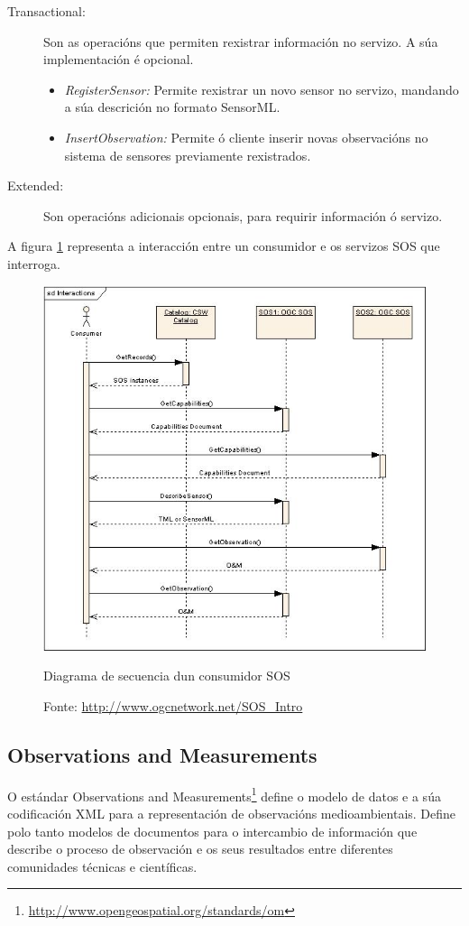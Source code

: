 \begin{description}
\begin{itemize}
\end{itemize}
\item[Transactional:] Son as operacións que permiten rexistrar información no servizo. A súa implementación é opcional.
\begin{itemize}
\item \textit{RegisterSensor:} Permite rexistrar un novo sensor no servizo, mandando a súa descrición no formato SensorML.
\item \textit{InsertObservation:} Permite ó cliente inserir novas observacións no sistema de sensores previamente rexistrados.
\end{itemize}
\item[Extended:] Son operacións adicionais opcionais, para requirir información ó servizo.
\end{description}

A figura \ref{fig:uml-sos} representa a interacción entre un consumidor e os servizos SOS que interroga.

\begin{figure}[hbtp]
  \centering
  \includegraphics[width=.85\textwidth]{images/SOS_consumer_seq.png}
  \caption{Diagrama de secuencia dun consumidor SOS}
  \label{fig:uml-sos}
  \caption*{Fonte: \url{http://www.ogcnetwork.net/SOS_Intro}}
\end{figure}

\subsection{Observations and Measurements}
O estándar Observations and Measurements\footnote{\url{http://www.opengeospatial.org/standards/om}} define o modelo de datos e a súa codificación XML para a representación de observacións medioambientais. Define polo tanto modelos de documentos para o intercambio de información que describe o proceso de observación e os seus resultados entre diferentes comunidades técnicas e científicas.

